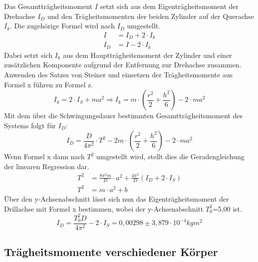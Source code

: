 \documentclass[titlepage = firstcover]{scrartcl}
\begin{document}
      Das Gesamtträgheitsmoment $I$ setzt sich aus dem Eigenträgheitsmoment der Drehachse $I_D$ und den Trägheitsmomenten der beiden Zylinder auf der Querachse 
      $I_k$. Die zugehörige Formel wird nach $I_D$ umgestellt.
      \begin{align}
        I &= I_D + 2 \cdot I_k \\
        I_D &= I -2 \cdot I_k
      \end{align}
      Dabei setzt sich $I_k$ aus dem Hauptträgheitsmoment der Zylinder und einer zusätzlichen Komponente aufgrund der Entfernung zur Drehachse zusammen.
      Anwenden des Satzes von Steiner und einsetzen der Trägheitsmomente aus Formel x führen zu Formel z.
      \begin{equation}
        I_k = 2 \cdot I_S + ma^2 \Rightarrow I_k = m \cdot (\frac{r^2}{2} + \frac{h^2}{6}) - 2 \cdot ma^2
      \end{equation}
      Mit dem über die Schwingungsdauer bestimmten Gesamtträgheitsmoment des Systems folgt für $I_D$:
      \begin{equation}
        I_D = \frac{D}{4\pi^2} \cdot T^2 - 2m \cdot (\frac{r^2}{2} + \frac{h^2}{6}) - 2 \cdot ma^2
      \end{equation}
      Wenn Formel x dann nach $T^2$ umgestellt wird, stellt dies die Geradengleichung der linearen Regression dar.
      \begin{align}
        T^2 &= \frac{8\pi^2m}{D} \cdot a^2  + \frac{4\pi^2}{D}(I_D + 2 \cdot I_S) \\
        T^2 &= m \cdot a^2 + b
      \end{align}
      Über den y-Achsenabschnitt lässt sich nun das Eigenträgheitsmoment der Drillachse mit Formel x bestimmen, wobei der y-Achsenabschnitt $T_0^2$=5,00 ist.
      \begin{equation}
        I_D = \frac{T_0^2D}{4\pi^2} - 2 \cdot I_S = 0,00298 \pm 3,879 \cdot 10^{-4}kgm^2
      \end{equation}

      \subsection{Trägheitsmomente verschiedener Körper}
      
     
      
\end{document}
